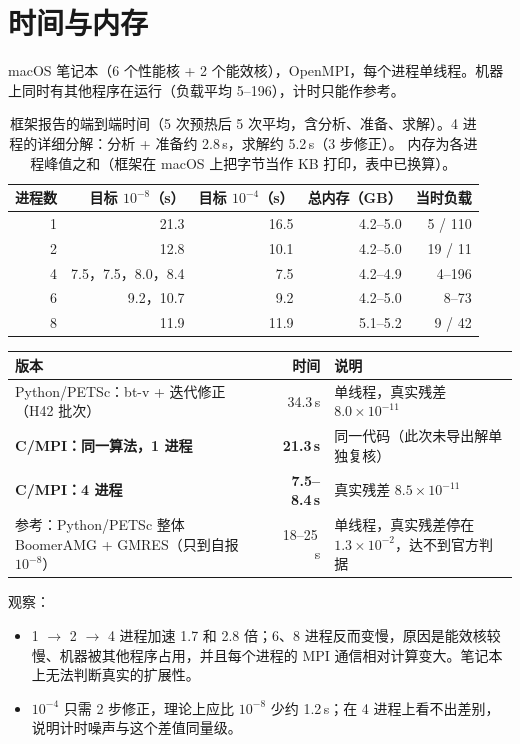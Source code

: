 \documentclass[11pt,a4paper]{ctexart}
\begin{document}
\section{时间与内存}
macOS 笔记本（6 个性能核 + 2 个能效核），OpenMPI，每个进程单线程。机器上同时有其他程序在运行（负载平均 5--196），计时只能作参考。
\begin{table}[H]
\centering
\small
\begin{tabular}{rrrrr}
\toprule
进程数 & 目标 $10^{-8}$（s） & 目标 $10^{-4}$（s） & 总内存（GB） & 当时负载 \\
\midrule
1 & 21.3 & 16.5 & 4.2--5.0 & 5 / 110 \\
2 & 12.8 & 10.1 & 4.2--5.0 & 19 / 11 \\
4 & 7.5，7.5，8.0，8.4 & 7.5 & 4.2--4.9 & 4--196 \\
6 & 9.2，10.7 & 9.2 & 4.2--5.0 & 8--73 \\
8 & 11.9 & 11.9 & 5.1--5.2 & 9 / 42 \\
\bottomrule
\end{tabular}
\caption{框架报告的端到端时间（5 次预热后 5 次平均，含分析、准备、求解）。4 进程的详细分解：分析 + 准备约 2.8\,s，求解约 5.2\,s（3 步修正）。
内存为各进程峰值之和（框架在 macOS 上把字节当作 KB 打印，表中已换算）。}
\end{table}
\begin{table}[H]
\centering
\small
\begin{tabular}{p{7.2cm}rp{6cm}}
\toprule
版本 & 时间 & 说明 \\
\midrule
Python/PETSc：bt-v + 迭代修正（H42 批次） & 34.3\,s & 单线程，真实残差 $8.0\times10^{-11}$ \\
\textbf{C/MPI：同一算法，1 进程} & \textbf{21.3\,s} & 同一代码（此次未导出解单独复核） \\
\textbf{C/MPI：4 进程} & \textbf{7.5--8.4\,s} & 真实残差 $8.5\times10^{-11}$ \\
参考：Python/PETSc 整体 BoomerAMG + GMRES（只到自报 $10^{-8}$） & 18--25\,s & 单线程，真实残差停在 $1.3\times10^{-2}$，达不到官方判据 \\
\bottomrule
\end{tabular}
\end{table}
观察：
\begin{itemize}
\item 1 $\to$ 2 $\to$ 4 进程加速 1.7 和 2.8 倍；6、8 进程反而变慢，原因是能效核较慢、机器被其他程序占用，并且每个进程的 MPI 通信相对计算变大。笔记本上无法判断真实的扩展性。
\item $10^{-4}$ 只需 2 步修正，理论上应比 $10^{-8}$ 少约 1.2\,s；在 4 进程上看不出差别，说明计时噪声与这个差值同量级。
\end{itemize}
\end{document}
